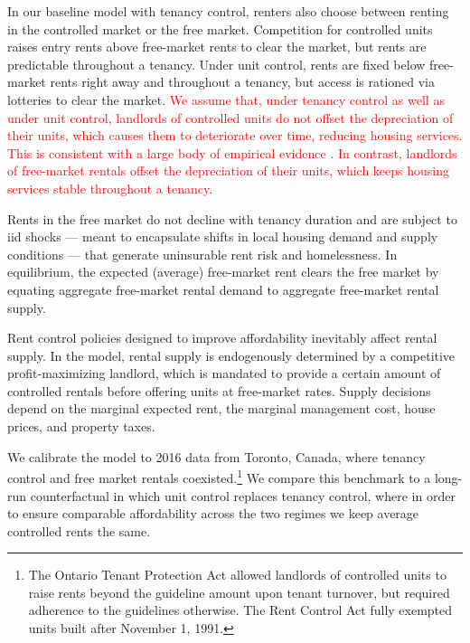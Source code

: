 \documentclass[parskip=full]{article}
\begin{document}
In our baseline model with tenancy control, renters also choose between renting in the controlled market or the free market. Competition for controlled units raises entry rents above free-market rents to clear the market, but rents are predictable throughout a tenancy. Under unit control, rents are fixed below free-market rents right away and throughout a tenancy, but access is rationed via lotteries to clear the market. \textcolor{red}{We assume that, under tenancy control as well as under unit control, landlords of controlled units do not offset the depreciation of their units, which causes them to deteriorate over time, reducing housing services. This is consistent with a large body of empirical evidence \citep{frankena-1975,gl-1990,murray_et_al-1991,sims-2007,app-2014}. In contrast, landlords of free-market rentals offset the depreciation of their units, which keeps housing services stable throughout a tenancy}.

Rents in the free market do not decline with tenancy duration and are subject to iid shocks — meant to encapsulate shifts in local housing demand and supply conditions — that generate uninsurable rent risk and homelessness. In equilibrium, the expected (average) free-market rent clears the free market by equating aggregate free-market rental demand to aggregate free-market rental supply.

Rent control policies designed to improve affordability inevitably affect rental supply. In the model, rental supply is endogenously determined by a competitive profit-maximizing landlord, which is mandated to provide a certain amount of controlled rentals before offering units at free-market rates. Supply decisions depend on the marginal expected rent, the marginal management cost, house prices, and property taxes. 

We calibrate the model to 2016 data from Toronto, Canada, where tenancy control and free market rentals coexisted.\footnote{The Ontario Tenant Protection Act allowed landlords of controlled units to raise rents beyond the guideline amount upon tenant turnover, but required adherence to the guidelines otherwise. The Rent Control Act fully exempted units built after November 1, 1991.} We compare this benchmark to a long-run counterfactual in which unit control replaces tenancy control, where in order to ensure comparable affordability across the two regimes we keep average controlled rents the same.
\end{document}

